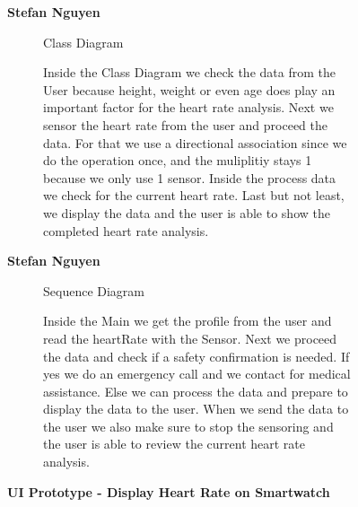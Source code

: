 \documentclass{article}
\begin{document}
	\clearpage
	\begin{figure}[htbp]
		\textbf{Stefan Nguyen}
		\centering
		\begin{subfigure}{\textwidth}
			\resizebox{\textwidth}{!}{}
			\caption{Class Diagram}
		\end{subfigure}
		\begin{subfigure}{\textwidth}
			Inside the Class Diagram we check the data from the User because height, weight or even age does play an important factor
			for the heart rate analysis. Next we sensor the heart rate from the user and proceed the data. For that we use a directional 
			association since we do the operation once, and the muliplitiy stays 1 because we only use 1 sensor. Inside the process data we check for 
			the current heart rate. Last but not least, we display the data and the user is able to show the completed heart rate 
			analysis. 
		\end{subfigure}
	\end{figure}
	\clearpage

	\begin{figure}[htbp]
		\textbf{Stefan Nguyen}
		\centering
		\begin{subfigure}{\textwidth}
			\resizebox{\textwidth}{!}{}
			\caption{Sequence Diagram}
		\end{subfigure}
		\begin{subfigure}{\textwidth}
			Inside the Main we get the profile from the user and read the heartRate with the Sensor. Next we proceed the data and check 
			if a safety confirmation is needed. If yes we do an emergency call and we contact for medical assistance. Else we can process 
			the data and prepare to display the data to the user. When we send the data to the user we also make sure to stop the sensoring and 
			the user is able to review the current heart rate analysis. 
		\end{subfigure}
	\end{figure}
	\clearpage
	\begin{figure}[htbp]
		\textbf{UI Prototype - Display Heart Rate on Smartwatch}
		\centering
		\begin{subfigure}{\textwidth}
			\resizebox{\textwidth}{!}{}
		\end{subfigure}
		\begin{subfigure}{\textwidth}
		
		\end{subfigure}
	\end{figure}
	\clearpage
\end{document}
